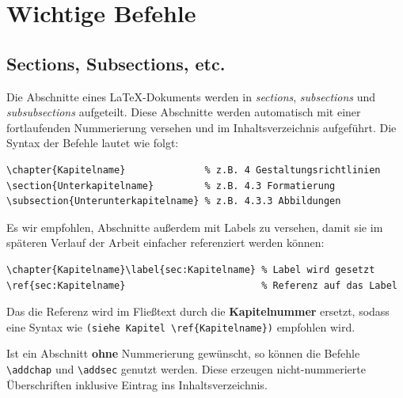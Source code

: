 \section{Wichtige Befehle}

\subsection{Sections, Subsections, etc.}

Die Abschnitte eines \LaTeX-Dokuments werden in \emph{sections}, \emph{subsections} und \emph{subsubsections} aufgeteilt.
Diese Abschnitte werden automatisch mit einer fortlaufenden Nummerierung versehen und im Inhaltsverzeichnis aufgeführt.
Die Syntax der Befehle lautet wie folgt:

\begin{verbatim}
\chapter{Kapitelname}              % z.B. 4 Gestaltungsrichtlinien
\section{Unterkapitelname}         % z.B. 4.3 Formatierung
\subsection{Unterunterkapitelname} % z.B. 4.3.3 Abbildungen
\end{verbatim}

Es wir empfohlen, Abschnitte außerdem mit Labels zu versehen, damit sie im späteren Verlauf der Arbeit einfacher referenziert werden können:

\begin{verbatim}
\chapter{Kapitelname}\label{sec:Kapitelname} % Label wird gesetzt
\ref{sec:Kapitelname}                        % Referenz auf das Label
\end{verbatim}

Das die Referenz wird im Fließtext durch die \textbf{Kapitelnummer} ersetzt, sodass eine Syntax wie \verb|(siehe Kapitel \ref{Kapitelname})| empfohlen wird.

Ist ein Abschnitt \textbf{ohne} Nummerierung gewünscht, so können die Befehle \verb|\addchap| und \verb|\addsec| genutzt werden. Diese erzeugen nicht-nummerierte Überschriften inklusive Eintrag ins Inhaltsverzeichnis.

